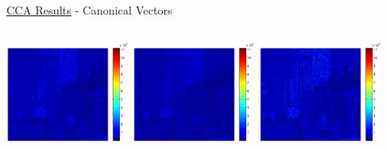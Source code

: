 \documentclass[8pt]{beamer}
\begin{document}
\begin{frame}{\href{run:/home/user/Documents/thesis_vids/flashing_cca.mp4}{CCA Results} -
    Canonical Vectors}
\begin{columns}
\begin{column}{0.9\textwidth}
\begin{center}
        \includegraphics[width=0.3\textwidth]{figures/flashing_cca_wy1.pdf}\hspace{1ex}
        \includegraphics[width=0.3\textwidth]{figures/flashing_cca_wy2.pdf}\hspace{1ex}
        \includegraphics[width=0.3\textwidth]{figures/flashing_cca_wy3.pdf}
      \end{center}
    \end{column}
  \end{columns}

\end{frame}
\end{document}
